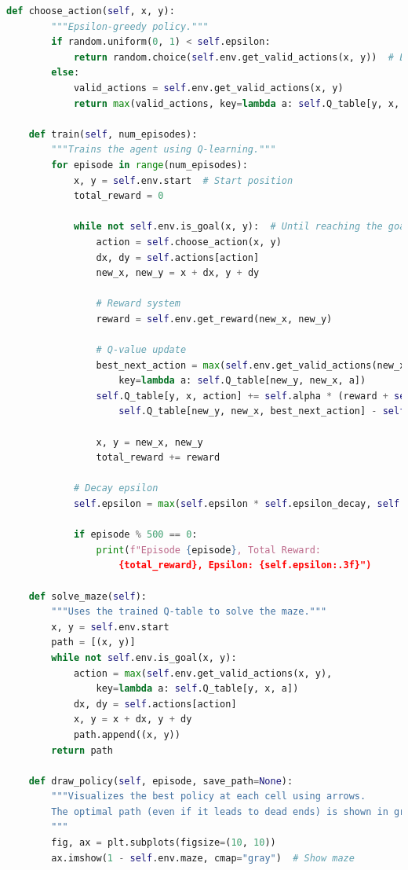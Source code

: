 \documentclass[11pt]{article}
\begin{document}
\begin{lstlisting}[language=Python]
    def choose_action(self, x, y):
        """Epsilon-greedy policy."""
        if random.uniform(0, 1) < self.epsilon:
            return random.choice(self.env.get_valid_actions(x, y))  # Explore
        else:
            valid_actions = self.env.get_valid_actions(x, y)
            return max(valid_actions, key=lambda a: self.Q_table[y, x, a])  # Exploit

    def train(self, num_episodes):
        """Trains the agent using Q-learning."""
        for episode in range(num_episodes):
            x, y = self.env.start  # Start position
            total_reward = 0

            while not self.env.is_goal(x, y):  # Until reaching the goal
                action = self.choose_action(x, y)
                dx, dy = self.actions[action]
                new_x, new_y = x + dx, y + dy

                # Reward system
                reward = self.env.get_reward(new_x, new_y)

                # Q-value update
                best_next_action = max(self.env.get_valid_actions(new_x, new_y),
                    key=lambda a: self.Q_table[new_y, new_x, a])
                self.Q_table[y, x, action] += self.alpha * (reward + self.gamma *
                    self.Q_table[new_y, new_x, best_next_action] - self.Q_table[y, x, action])

                x, y = new_x, new_y
                total_reward += reward

            # Decay epsilon
            self.epsilon = max(self.epsilon * self.epsilon_decay, self.epsilon_min)

            if episode % 500 == 0:
                print(f"Episode {episode}, Total Reward: 
                    {total_reward}, Epsilon: {self.epsilon:.3f}")

    def solve_maze(self):
        """Uses the trained Q-table to solve the maze."""
        x, y = self.env.start
        path = [(x, y)]
        while not self.env.is_goal(x, y):
            action = max(self.env.get_valid_actions(x, y),
                key=lambda a: self.Q_table[y, x, a])
            dx, dy = self.actions[action]
            x, y = x + dx, y + dy
            path.append((x, y))
        return path

    def draw_policy(self, episode, save_path=None):
        """Visualizes the best policy at each cell using arrows.
        The optimal path (even if it leads to dead ends) is shown in green.
        """
        fig, ax = plt.subplots(figsize=(10, 10))
        ax.imshow(1 - self.env.maze, cmap="gray")  # Show maze


\end{lstlisting}
\end{document}
